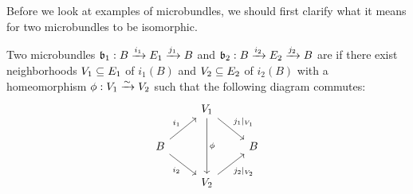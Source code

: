 Before we look at examples of microbundles, we should first clarify
what it means for two microbundles to be isomorphic.

\begin{mydefinition}[isomorphy]
    Two microbundles $\bundledef{\bb_1}{B}{E_1}{i_1}{j_1}$ and $\bundledef{\bb_2}{B}{E_2}{i_2}{j_2}$ are  if
    there exist neighborhoods $V_1 \sub E_1$ of $i_1(B)$ and $V_2 \sub E_2$ of $i_2(B)$ with
    a homeomorphism $\phi: V_1 \isomto V_2$ such that the following diagram commutes: 
    \[
        \begin{tikzcd}
            & V_1 \ar[dr, "j_1\vert_{V_1}"] \ar[dd, "\phi"] & \\
            B \ar[ur, "i_1"] \ar[dr, "i_2"'] & & B \\
            & V_2 \ar[ur, "j_2\vert_{V_2}"'] &
        \end{tikzcd}
    \]
\end{mydefinition}